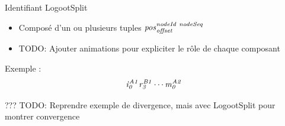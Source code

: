 \begin{frame}{Identifiant LogootSplit}
    \begin{itemize}
        \item Composé d'un ou plusieurs tuples $\mathit{pos}^{\mathit{nodeId~nodeSeq}}_{\mathit{offset}}$
        \item TODO: Ajouter animations pour expliciter le rôle de chaque composant
    \end{itemize}
    Exemple :
    \begin{equation*}
        \mathit{i}^{\mathit{A1}}_{\mathit{0}}\mathit{r}^{\mathit{B1}}_{\mathit{3}}\cdots\mathit{m}^{\mathit{A2}}_{\mathit{0}}
    \end{equation*}
\end{frame}

\begin{frame}{???}
    TODO: Reprendre exemple de divergence, mais avec LogootSplit pour montrer convergence
\end{frame}

